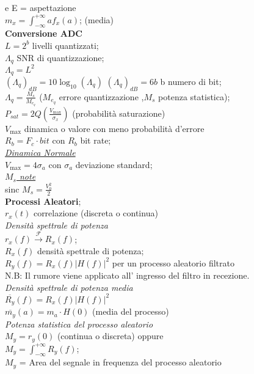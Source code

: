 \documentclass[a4paper]{article}
\begin{document}
\begin{multicols*}{3}
e E = aspettazione\\
$m_x=\int_{-\infty}^{+\infty} a f_x(a)$; (media)\\
\textbf{Conversione ADC} \\
$L=2^b$ livelli quantizzati; \\
${\Lambda_q}$ SNR di quantizzazione; \\
$\Lambda_q = L^2$ \\
${({\Lambda}_q)}_{dB}=10\log_{10}{(\Lambda_q)}$
${(\Lambda_q)}_{dB} = 6b$ b numero di bit; \\
${\Lambda}_q=\frac{M_s}{M_{e_q}}$ ($M_{e_q}$ errore quantizzazione 
,$M_s$ potenza statistica); \\
$P_{sat}=2Q(\frac{V_{\max}}{\sigma_x})$ (probabilità saturazione) \\
$V_{\max}$ dinamica o valore con meno probabilità d'errore \\
$R_b=F_c \cdot bit$ con $R_b$ bit rate; \\
\underline{\textit{Dinamica Normale}} \\
$V_{\max} = 4\sigma_a$ con $\sigma_a$ deviazione standard;\\ 
\underline{\textit{$M_s$ note}} \\
sinc $M_s = \frac{V_0^2}{2}$ \\
\textbf{Processi Aleatori}; \\
$r_x(t)$ correlazione (discreta o continua) \\
\textit{Densità spettrale di potenza} \\
$r_x(f) \xrightarrow{\mathscr{F}} R_x(f)$; \\ 
$R_x(f)$ densità spettrale di potenza; \\
$R_y(f) = R_x(f) |H(f)|^2$ per un processo aleatorio filtrato\\
N.B: Il rumore viene applicato all' ingresso del filtro in recezione. \\
\textit{Densità spettrale di potenza media} \\
$\overline{R_y}(f) = R_x(f) |H(f)|^2$ \\
$\overline{m_y}(a)=m_a\cdot H(0)$ (media del processo)\\
\textit{Potenza statistica del processo aleatorio} \\
$M_y = r_y(0)$ (continua o discreta) oppure \\
$M_y = \int_{-\infty}^{+\infty} R_y(f)$;\\
$M_y$ = Area del segnale in frequenza del processo aleatorio \\

\end{multicols*}
\end{document}
